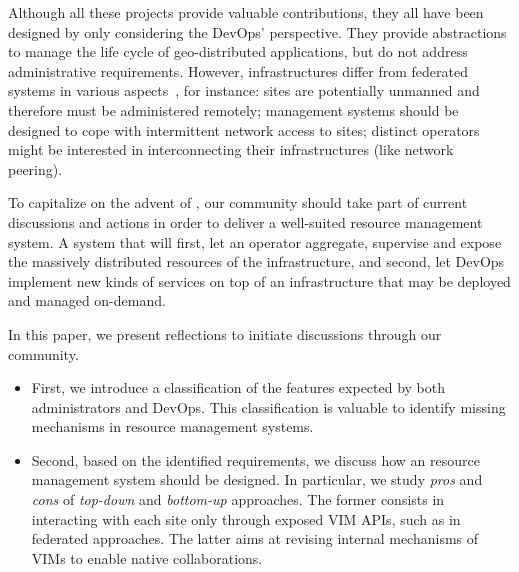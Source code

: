 Although all these projects provide valuable contributions, they all have
been designed by only considering the DevOps' perspective. They provide
abstractions to manage the life cycle of geo-distributed applications,
but do not address administrative requirements.
%
However, \edgecomputing infrastructures differ from federated \cloud systems
in various aspects~\cite{openstack:whitepaper}, for instance:
\edge sites are potentially unmanned and therefore must be administered remotely;
management systems should be designed to cope with intermittent network access to sites; distinct operators might be interested in interconnecting their infrastructures (like network peering).
%

To capitalize on the advent of \edgecomputing, our community should take part
of current discussions and actions in order to deliver a well-suited
resource management system. A system that will first, let an operator aggregate, supervise and expose the massively distributed resources of the infrastructure,
and second, let DevOps implement new kinds of services on top of an infrastructure that may be deployed and managed on-demand.


In this paper, we present reflections to initiate discussions through our community.

\begin{itemize}[noitemsep, topsep=0pt]
\item First, we introduce a classification of the features expected by
  both administrators and DevOps. This classification is valuable to
  identify missing mechanisms in resource management systems.
\item Second, based on the identified requirements, we discuss
  how an \edge resource management system
  should be designed. In particular, we study \emph{pros} and
  \emph{cons} of \emph{top-down} and \emph{bottom-up} approaches. The
  former consists in interacting with each site only through
  exposed VIM APIs, such as in federated approaches. The
  latter aims at revising internal mechanisms of VIMs to enable native
  collaborations.
  \end{itemize}

